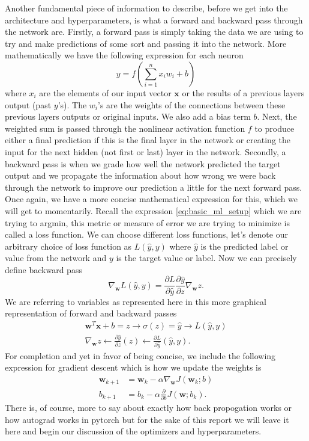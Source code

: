 \documentclass[11pt]{amsart}
\begin{document}
Another fundamental piece of information to describe, before we get into the architecture and hyperparameters, is what a forward and backward pass through the network are.
Firstly, a forward pass is simply taking the data we are using to try and make predictions of some sort and passing it into the network.
More mathematically we have the following expression for each neuron
\begin{equation}
y = f\left( \sum_{i=1}^n x_i w_i + b \right)
\label{eq:neuron_calc}
\end{equation}
where $x_i$ are the elements of our input vector $\bm x$  or the results of a previous layers output (past $y$'s).
The $w_i$'s are the weights of the connections between these previous layers outputs or original inputs.
We also add a bias term $b$.
Next, the weighted sum is passed through the nonlinear activation function $f$ to produce either a final prediction if this is the final layer in the network or creating the input for the next hidden (not first or last) layer in the network.
Secondly, a backward pass is when we grade how well the network predicted the target output and we propagate the information about how wrong we were back through the network to improve our prediction a little for the next forward pass.
Once again, we have a more concise mathematical expression for this, which we will get to momentarily.
Recall the expression \eqref{eq:basic_ml_setup} which we are trying to argmin, this metric or measure of error we are trying to minimize is called a loss function.
We can choose different loss functions, let's denote our arbitrary choice of loss function as $L(\hat y, y)$ where $\hat y$ is the predicted label or value from the network and $y$ is the target value or label.
Now we can precisely define backward pass
\begin{equation}
\nabla_{\bm w} L(\hat y, y) = \frac {\partial L}{\partial \hat y} \frac {\partial \hat y}{\partial z} \nabla_{\bm w} z.
\label{eq:back_prop}
\end{equation}
We are referring to variables as represented here in this more graphical representation of forward and backward passes
\begin{align*}
\boxed{\bm w^T \bm x + b = z} \rightarrow \boxed{\sigma(z) = \hat y} \rightarrow \boxed{L(\hat y , y)} \\
\boxed{\nabla_{\bm w} z} \leftarrow \boxed{\frac {\partial \hat y}{\partial z} (z)} \leftarrow \boxed{\frac {\partial L}{\partial \hat y}(\hat y , y)}.
\end{align*}
For completion and yet in favor of being concise, we include the following expression for gradient descent which is how we update the weights is
\begin{align*}
\bm w_{k + 1} &= \bm w_{k} - \alpha \nabla_{\bm w} J(\bm w_{k}; b) \\
b_{k + 1} &= b_{k} - \alpha \frac \partial {\partial b}J(\bm w; b_k).
\label{eq:gd}
\end{align*}
There is, of course, more to say about exactly how back propogation works or how autograd works in pytorch but for the sake of this report we will leave it here and begin our discussion of the optimizers and hyperparameters.
\end{document}
